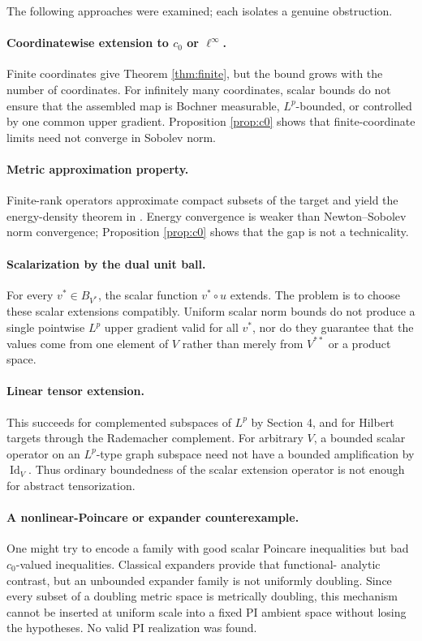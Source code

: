 \documentclass[11pt]{article}
\theoremstyle{remark}
\begin{document}
The following approaches were examined; each isolates a genuine obstruction.

\paragraph{Coordinatewise extension to $c_0$ or $\ell^\infty$.}
Finite coordinates give Theorem \ref{thm:finite}, but the bound grows with
the number of coordinates.  For infinitely many coordinates, scalar bounds
do not ensure that the assembled map is Bochner measurable, $L^p$-bounded,
or controlled by one common upper gradient.  Proposition \ref{prop:c0}
shows that finite-coordinate limits need not converge in Sobolev norm.

\paragraph{Metric approximation property.}
Finite-rank operators approximate compact subsets of the target and yield
the energy-density theorem in \cite{GBIZ23}.  Energy convergence is weaker
than Newton--Sobolev norm convergence; Proposition \ref{prop:c0} shows that
the gap is not a technicality.

\paragraph{Scalarization by the dual unit ball.}
For every $v^*\in B_{V^*}$, the scalar function $v^*\circ u$ extends.  The
problem is to choose these scalar extensions compatibly.  Uniform scalar
norm bounds do not produce a single pointwise $L^p$ upper gradient valid for
all $v^*$, nor do they guarantee that the values come from one element of
$V$ rather than merely from $V^{**}$ or a product space.

\paragraph{Linear tensor extension.}
This succeeds for complemented subspaces of $L^p$ by Section 4, and for
Hilbert targets through the Rademacher complement.  For arbitrary $V$, a
bounded scalar operator on an $L^p$-type graph subspace need not have a
bounded amplification by $\operatorname{Id}_V$.  Thus ordinary boundedness of
the scalar extension operator is not enough for abstract tensorization.

\paragraph{A nonlinear-Poincare or expander counterexample.}
One might try to encode a family with good scalar Poincare inequalities but
bad $c_0$-valued inequalities.  Classical expanders provide that functional-
analytic contrast, but an unbounded expander family is not uniformly
doubling.  Since every subset of a doubling metric space is metrically
doubling, this mechanism cannot be inserted at uniform scale into a fixed
PI ambient space without losing the hypotheses.  No valid PI realization
was found.
\end{document}
